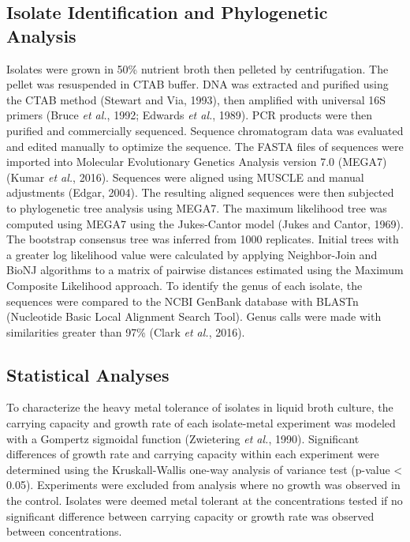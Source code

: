 \documentclass[ms, hidelinks]{uncgdissertationexp}
\theoremstyle{plain}
\theoremstyle{definition}
\theoremstyle{remark}
\begin{document}
\hypertarget{isolate-identification-and-phylogenetic-analysis}{%
\subsection{Isolate Identification and Phylogenetic Analysis}\label{isolate-identification-and-phylogenetic-analysis}}

Isolates were grown in 50\% nutrient broth then pelleted by centrifugation. The pellet was resuspended in CTAB buffer. DNA was extracted and purified using the CTAB method (Stewart and Via, 1993), then amplified with universal 16S primers (Bruce \emph{et al.}, 1992; Edwards \emph{et al.}, 1989). PCR products were then purified and commercially sequenced. Sequence chromatogram data was evaluated and edited manually to optimize the sequence. The FASTA files of sequences were imported into Molecular Evolutionary Genetics Analysis version 7.0 (MEGA7) (Kumar \emph{et al.}, 2016). Sequences were aligned using MUSCLE and manual adjustments (Edgar, 2004). The resulting aligned sequences were then subjected to phylogenetic tree analysis using MEGA7. The maximum likelihood tree was computed using MEGA7 using the Jukes-Cantor model (Jukes and Cantor, 1969). The bootstrap consensus tree was inferred from 1000 replicates. Initial trees with a greater log likelihood value were calculated by applying Neighbor-Join and BioNJ algorithms to a matrix of pairwise distances estimated using the Maximum Composite Likelihood approach. To identify the genus of each isolate, the sequences were compared to the NCBI GenBank database with BLASTn (Nucleotide Basic Local Alignment Search Tool). Genus calls were made with similarities greater than 97\% (Clark \emph{et al.}, 2016).

\hypertarget{statistical-analyses}{%
\subsection{Statistical Analyses}\label{statistical-analyses}}

To characterize the heavy metal tolerance of isolates in liquid broth culture, the carrying capacity and growth rate of each isolate-metal experiment was modeled with a Gompertz sigmoidal function (Zwietering \emph{et al.}, 1990). Significant differences of growth rate and carrying capacity within each experiment were determined using the Kruskall-Wallis one-way analysis of variance test (p-value \textless{} 0.05). Experiments were excluded from analysis where no growth was observed in the control. Isolates were deemed metal tolerant at the concentrations tested if no significant difference between carrying capacity or growth rate was observed between concentrations.
\end{document}

